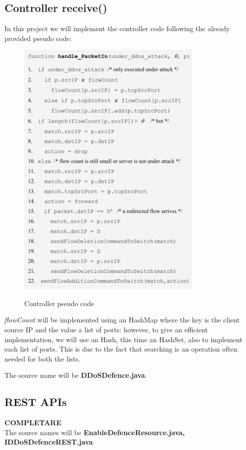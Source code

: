 \subsection{Controller receive()}
In this project we will implement the controller code following the already provided pseudo code:
\begin{figure}[H]
\begin{center}
\includegraphics[width=0.8\textwidth]{images/PseudoCode.png}
\label{fig:pseudocode}
\caption{Controller pseudo code}
\end{center}
\end{figure}

\textit{flowCount} will be implemented using an HashMap where the key is the client source IP and the value a list of ports: however, to give an efficient implementation, we will use an Hash, this time an HashSet, also to implement each list of ports. This is due to the fact that searching is an operation often needed for both the lists.

The source name will be \textbf{DDoSDefence.java}.

\subsection{REST APIs}
\textbf{COMPLETARE}\\
The source names will be \textbf{EnableDefenceResource.java, IDDoSDefenceREST.java}.

